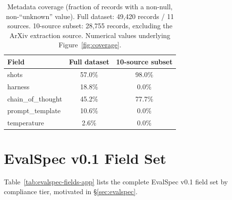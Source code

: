 \documentclass[11pt]{article}
\begin{document}
\begin{table}[ht]
\centering
\small
\begin{tabular}{lcc}
\toprule
Field & Full dataset & 10-source subset \\
\midrule
shots & 57.0\% & 98.0\% \\
harness & 18.8\% & 0.0\% \\
chain\_of\_thought & 45.2\% & 77.7\% \\
prompt\_template & 10.6\% & 0.0\% \\
temperature & 2.6\% & 0.0\% \\
\bottomrule
\end{tabular}
\caption{Metadata coverage (fraction of records with a non-null,
non-``unknown'' value). Full dataset: 49{,}420 records / 11 sources.
10-source subset: 28{,}755 records, excluding the ArXiv extraction
source. Numerical values underlying Figure~\ref{fig:coverage}.}
\label{tab:coverage-app}
\end{table}


\section{EvalSpec v0.1 Field Set}
\label{app:evalspec}

Table~\ref{tab:evalspec-fields-app} lists the complete EvalSpec v0.1 field
set by compliance tier, motivated in \S\ref{sec:evalspec}.
\end{document}
